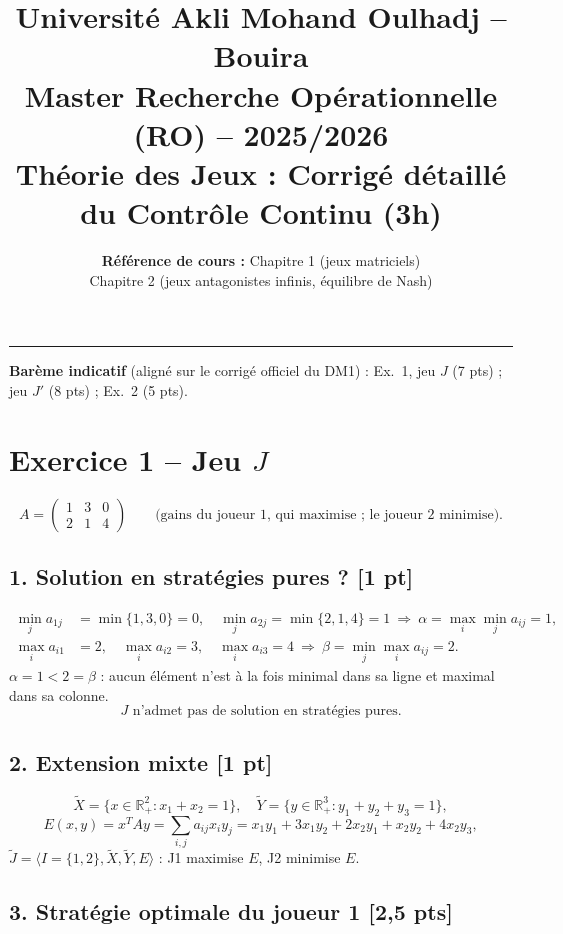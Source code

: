 \documentclass[11pt,a4paper]{article}
\title{\textbf{Université Akli Mohand Oulhadj -- Bouira}\\
\large Master Recherche Opérationnelle (RO) -- 2025/2026\\
\Large \textbf{Théorie des Jeux : Corrigé détaillé du Contrôle Continu (3h)}}
\author{\textbf{Référence de cours :} Chapitre 1 (jeux matriciels)\\ Chapitre 2 (jeux antagonistes infinis, équilibre de Nash)}
\date{}
\newcommand{\Xt}{\tilde{X}}
\newcommand{\Yt}{\tilde{Y}}
\begin{document}
\maketitle
\hrule
\vspace{0.3cm}
\textbf{Barème indicatif} (aligné sur le corrigé officiel du DM1) : Ex.~1, jeu $J$ (7 pts) ; jeu $J'$ (8 pts) ; Ex.~2 (5 pts).

\section*{Exercice 1 -- Jeu $J$}
\[
A=\begin{pmatrix}1&3&0\\2&1&4\end{pmatrix}\qquad\text{(gains du joueur 1, qui maximise ; le joueur 2 minimise).}
\]

\subsection*{1. Solution en stratégies pures ? \hfill[1 pt]}
\begin{align*}
\min_j a_{1j}&=\min\{1,3,0\}=0,\quad \min_j a_{2j}=\min\{2,1,4\}=1\ \Rightarrow\ \alpha=\max_i\min_j a_{ij}=1,\\
\max_i a_{i1}&=2,\quad\max_i a_{i2}=3,\quad\max_i a_{i3}=4\ \Rightarrow\ \beta=\min_j\max_i a_{ij}=2.
\end{align*}
$\alpha=1<2=\beta$ : aucun élément n'est à la fois minimal dans sa ligne et maximal dans sa colonne.
\[\boxed{J \text{ n'admet pas de solution en stratégies pures.}}\]

\subsection*{2. Extension mixte \hfill[1 pt]}
\[
\Xt=\{x\in\mathbb{R}^2_+ : x_1+x_2=1\},\quad \Yt=\{y\in\mathbb{R}^3_+ : y_1+y_2+y_3=1\},
\]
\[
E(x,y)=x^TAy=\sum_{i,j}a_{ij}x_iy_j=x_1y_1+3x_1y_2+2x_2y_1+x_2y_2+4x_2y_3,
\]
$\tilde J=\langle I=\{1,2\},\Xt,\Yt,E\rangle$ : J1 maximise $E$, J2 minimise $E$.

\subsection*{3. Stratégie optimale du joueur 1 \hfill[2,5 pts]}
\end{document}

